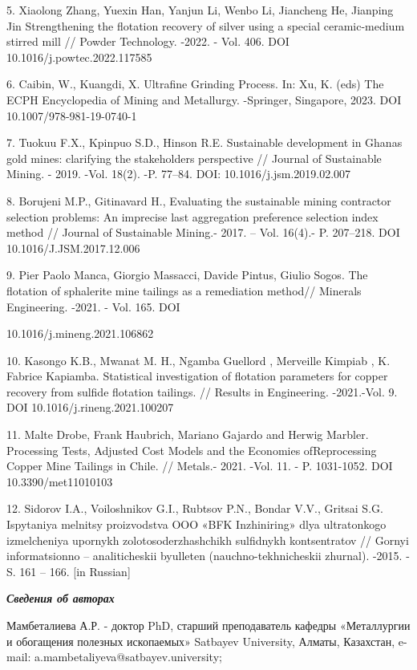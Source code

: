 5. Xiaolong Zhang, Yuexin Han, Yanjun Li, Wenbo Li, Jiancheng He,
Jianping Jin Strengthening the flotation recovery of silver using a
special ceramic-medium stirred mill // Powder Technology. -2022. - Vol.
406. DOI 10.1016/j.powtec.2022.117585

6. Caibin, W., Kuangdi, X. Ultrafine Grinding Process. In: Xu, K. (eds)
The ECPH Encyclopedia of Mining and Metallurgy. -Springer, Singapore,
2023. DOI 10.1007/978-981-19-0740-1

7. Tuokuu F.X., Kpinpuo S.D., Hinson R.E. Sustainable development in
Ghana\textquotesingle s gold mines: clarifying the
stakeholder\textquotesingle s perspective // Journal of Sustainable
Mining. - 2019. -Vol. 18(2). -P. 77--84. DOI: 10.1016/j.jsm.2019.02.007

8. Borujeni M.P., Gitinavard H., Evaluating the sustainable mining
contractor selection problems: An imprecise last aggregation preference
selection index method // Journal of Sustainable Mining.- 2017. -- Vol.
16(4).- P. 207--218. DOI 10.1016/J.JSM.2017.12.006

9. Pier Paolo Manca, Giorgio Massacci, Davide Pintus, Giulio Sogos. The
flotation of sphalerite mine tailings as a remediation method// Minerals
Engineering. -2021. - Vol. 165. DOI

10.1016/j.mineng.2021.106862

10. Kasongo K.B., Mwanat M. H., Ngamba Guellord , Merveille Kimpiab , K.
Fabrice Kapiamba. Statistical investigation of flotation parameters for
copper recovery from sulfide flotation tailings. // Results in
Engineering. -2021.-Vol. 9. DOI 10.1016/j.rineng.2021.100207

11. Malte Drobe, Frank Haubrich, Mariano Gajardo and Herwig Marbler.
Processing Tests, Adjusted Cost Models and the Economies ofReprocessing
Copper Mine Tailings in Chile. // Metals.- 2021. -Vol. 11. - P.
1031-1052. DOI 10.3390/met11010103

12. Sidorov I.A., Voiloshnikov G.I., Rubtsov P.N.,
Bondar\textquotesingle{} V.V., Gritsai S.G. Ispytaniya
mel\textquotesingle nitsy proizvodstva OOO «BFK Inzhiniring» dlya
ul\textquotesingle tratonkogo izmel\textquotesingle cheniya upornykh
zolotosoderzhashchikh sul\textquotesingle fidnykh kontsentratov //
Gornyi informatsionno -- analiticheskii byulleten\textquotesingle{}
(nauchno-tekhnicheskii zhurnal). -2015. - S. 161 -- 166. {[}in
Russian{]}

\emph{{\bfseries Сведения об авторах}}

Мамбеталиева А.Р. - доктор PhD, старший преподаватель кафедры
«Металлургии и обогащения полезных ископаемых» Satbayev University,
Алматы, Казахстан, e-mail: a.mambetaliyeva@satbayev.university;

